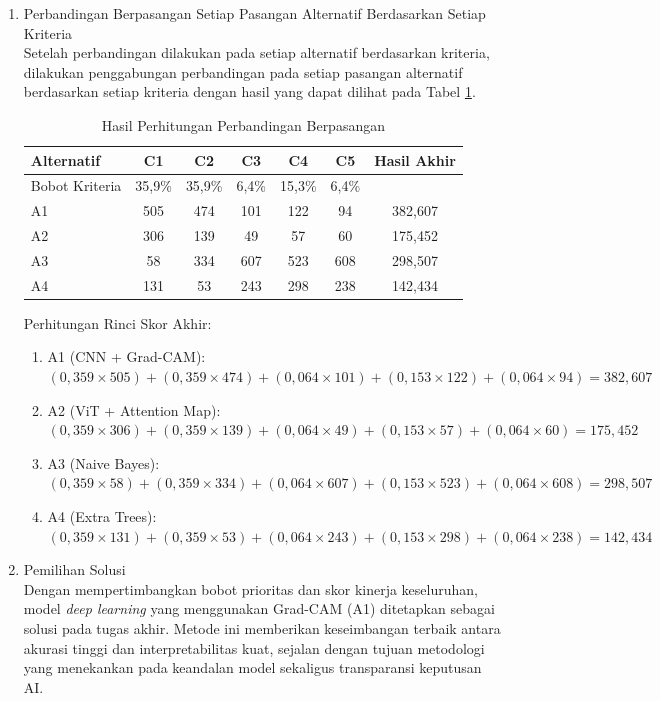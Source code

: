 \begin{enumerate}
	\item Perbandingan Berpasangan Setiap Pasangan Alternatif Berdasarkan Setiap Kriteria \\
	Setelah perbandingan dilakukan pada setiap alternatif berdasarkan kriteria, dilakukan penggabungan perbandingan pada setiap pasangan alternatif berdasarkan setiap kriteria dengan hasil yang dapat dilihat pada Tabel \ref{tab:hasil_perhitungan}.
	\begin{table}[h]
		\centering
		\caption{Hasil Perhitungan Perbandingan Berpasangan}
		\label{tab:hasil_perhitungan}
		\begin{tabular}{|l|c|c|c|c|c|c|}
			\hline
			Alternatif & C1 & C2 & C3 & C4 & C5 & Hasil Akhir \\ \hline
			Bobot Kriteria & 35,9\% & 35,9\% & 6,4\% & 15,3\% & 6,4\% & \\ \hline
			A1 & 505 & 474 & 101 & 122 & 94 & 382,607 \\ \hline
			A2 & 306 & 139 & 49 & 57 & 60 & 175,452 \\ \hline
			A3 & 58 & 334 & 607 & 523 & 608 & 298,507 \\ \hline
			A4 & 131 & 53 & 243 & 298 & 238 & 142,434 \\ \hline
		\end{tabular}
	\end{table}
	Perhitungan Rinci Skor Akhir:
	\begin{enumerate}
		\item A1 (CNN + Grad-CAM): $(0,359 \times 505) + (0,359 \times 474) + (0,064 \times 101) + (0,153 \times 122) + (0,064 \times 94) = 382,607$
		\item A2 (ViT + Attention Map): $(0,359 \times 306) + (0,359 \times 139) + (0,064 \times 49) + (0,153 \times 57) + (0,064 \times 60) = 175,452$
		\item A3 (Naive Bayes): $(0,359 \times 58) + (0,359 \times 334) + (0,064 \times 607) + (0,153 \times 523) + (0,064 \times 608) = 298,507$
		\item A4 (Extra Trees): $(0,359 \times 131) + (0,359 \times 53) + (0,064 \times 243) + (0,153 \times 298) + (0,064 \times 238) = 142,434$
	\end{enumerate}
	\item Pemilihan Solusi \\
	Dengan mempertimbangkan bobot prioritas dan skor kinerja keseluruhan, model \textit{deep learning} yang menggunakan Grad-CAM (A1) ditetapkan sebagai solusi pada tugas akhir. Metode ini memberikan keseimbangan terbaik antara akurasi tinggi dan interpretabilitas kuat, sejalan dengan tujuan metodologi yang menekankan pada keandalan model sekaligus transparansi keputusan AI.
\end{enumerate}